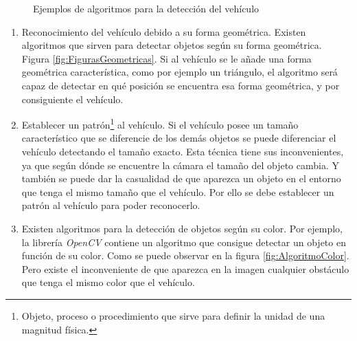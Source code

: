 \begin{figure}
 \centering
 \caption{Ejemplos de algoritmos para la detección del vehículo}
 \label{fig:AlgoritmosVehiculo}
\end{figure}

\begin{enumerate}
\item Reconocimiento del vehículo debido a su forma geométrica. Existen algoritmos que sirven para detectar objetos según su forma geométrica. Figura \ref{fig:FigurasGeometricas}. Si al vehículo se le añade una forma geométrica característica, como por ejemplo un triángulo, el algoritmo será capaz de detectar en qué posición se encuentra esa forma geométrica, y por consiguiente el vehículo. \cite{FormasGeometricas}
\item  Establecer un patrón\footnote{Objeto, proceso o procedimiento que sirve para definir la unidad de una magnitud física.} al vehículo. Si el vehículo posee un tamaño característico que se diferencie de los demás objetos se puede diferenciar el vehículo detectando el tamaño exacto. Esta técnica tiene sus inconvenientes, ya que según dónde se encuentre la cámara el tamaño del objeto cambia. Y también se puede dar la casualidad de que aparezca un objeto en el entorno que tenga el mismo tamaño que el vehículo. Por ello se debe establecer un patrón al vehículo para poder reconocerlo. \cite{Patrones}
\item Existen algoritmos para la detección de objetos según su color. Por ejemplo, la librería \emph{OpenCV} \cite{OpenCV} contiene un algoritmo que consigue detectar un objeto en función de su color. \cite{AlgoritmoColor} Como se puede observar en la figura \ref{fig:AlgoritmoColor}. Pero existe el inconveniente de que aparezca en la imagen cualquier obstáculo que tenga el mismo color que el vehículo.
\end{enumerate}

